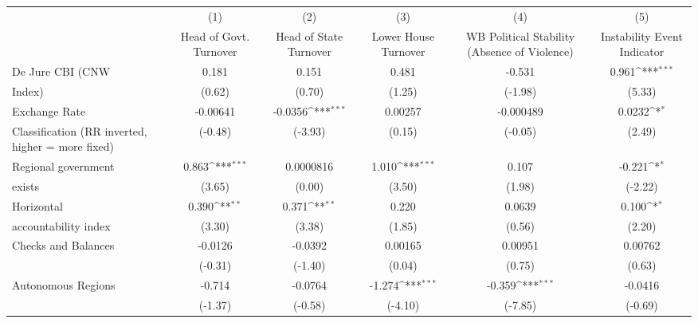 {
\def\sym#1{\ifmmode^{#1}\else\(^{#1}\)\fi}
\begin{tabular}{l*{5}{c}}
\hline\hline
                    &\multicolumn{1}{c}{(1)}&\multicolumn{1}{c}{(2)}&\multicolumn{1}{c}{(3)}&\multicolumn{1}{c}{(4)}&\multicolumn{1}{c}{(5)}\\
                    &\multicolumn{1}{c}{Head of Govt. Turnover}&\multicolumn{1}{c}{Head of State Turnover}&\multicolumn{1}{c}{Lower House Turnover}&\multicolumn{1}{c}{WB Political Stability (Absence of Violence)}&\multicolumn{1}{c}{Instability Event Indicator}\\
\hline
De Jure CBI (CNW    &       0.181         &       0.151         &       0.481         &      -0.531         &       0.961\sym{***}\\
Index)              &      (0.62)         &      (0.70)         &      (1.25)         &     (-1.98)         &      (5.33)         \\
[1em]
Exchange Rate       &    -0.00641         &     -0.0356\sym{***}&     0.00257         &   -0.000489         &      0.0232\sym{*}  \\
Classification (RR inverted, higher = more fixed)&     (-0.48)         &     (-3.93)         &      (0.15)         &     (-0.05)         &      (2.49)         \\
[1em]
Regional government &       0.863\sym{***}&   0.0000816         &       1.010\sym{***}&       0.107         &      -0.221\sym{*}  \\
exists              &      (3.65)         &      (0.00)         &      (3.50)         &      (1.98)         &     (-2.22)         \\
[1em]
Horizontal          &       0.390\sym{**} &       0.371\sym{**} &       0.220         &      0.0639         &       0.100\sym{*}  \\
accountability index&      (3.30)         &      (3.38)         &      (1.85)         &      (0.56)         &      (2.20)         \\
[1em]
Checks and Balances &     -0.0126         &     -0.0392         &     0.00165         &     0.00951         &     0.00762         \\
                    &     (-0.31)         &     (-1.40)         &      (0.04)         &      (0.75)         &      (0.63)         \\
[1em]
Autonomous Regions  &      -0.714         &     -0.0764         &      -1.274\sym{***}&      -0.359\sym{***}&     -0.0416         \\
                    &     (-1.37)         &     (-0.58)         &     (-4.10)         &     (-7.85)         &     (-0.69)         \\

\end{tabular}}
